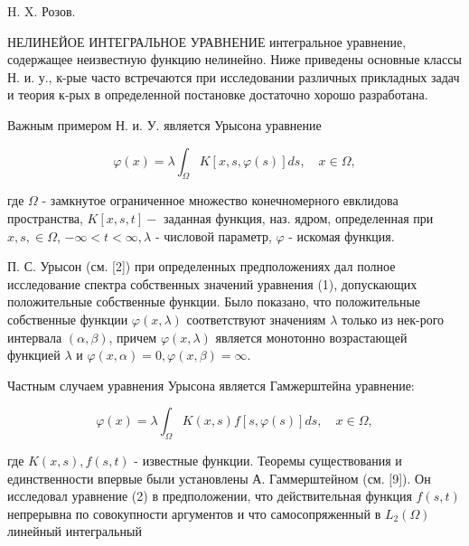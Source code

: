 \documentclass[10pt]{article}
\begin{document}
H. X. Розов.



НЕЛИНЕЙОЕ ИНТЕГРАЛЬНОЕ УРАВНЕНИЕ интегральное уравнение, содержащее неизвестную функцию нелинейно. Ниже приведены основные классы Н. и. у., к-рые часто встречаются при исследовании различных прикладных задач и теория к-рых в определенной постановке достаточно хорошо разработана.



Важным примером Н. и. У. является Урысона уравнение



\[

\varphi(x)=\lambda \int_{\Omega} K[x, s, \varphi(s)] d s, \quad x \in \Omega,

\]



где $\Omega$ - замкнутое ограниченное множество конечномерного евклидова пространства, $K[x, s, t]-$ заданная функция, наз. ядром, определенная при $x, s, \in \Omega$, $-\infty<t<\infty, \lambda$ - числовой параметр, $\varphi$ - искомая функция.



П. С. Урысон (см. [2]) при определенных предположениях дал полное исследование спектра собственных значений уравнения (1), допускающих положительные собственные функции. Было показано, что положительные собственные функции $\varphi(x, \lambda)$ соответствуют значениям $\lambda$ только из нек-рого интервала $(\alpha, \beta)$, причем $\varphi(x, \lambda)$ является монотонно возрастающей функцией $\lambda$ и $\varphi(x, \alpha)=0, \varphi(x, \beta)=\infty$.



Частным случаем уравнения Урысона является Гамжерштейна уравнение:



\[

\varphi(x)=\lambda \int_{\Omega} K(x, s) f[s, \varphi(s)] d s, \quad x \in \Omega,

\]



где $K(x, s), f(s, t)$ - известные функции. Теоремы существования и единственности впервые были установлены А. Гаммерштейном (см. [9]). Он исследовал уравнение (2) в предположении, что действительная функция $f(s, t)$ непрерывна по совокупности аргументов и что самосопряженный в $L_{2}(\Omega)$ линейный интегральный
\end{document}
